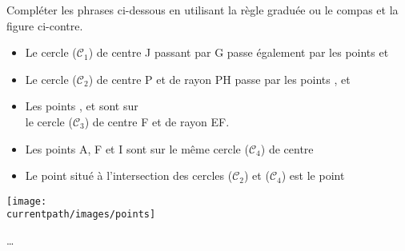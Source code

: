 \begin{exercice*}
  Compléter les phrases ci-dessous en utilisant la règle graduée ou le compas et la figure ci-contre.
  \begin{itemize}
     \item Le cercle ($\mathcal{C}_1$) de centre J passant par G passe également par les points \makebox[0.15\linewidth]{\dotfill} et  \makebox[0.15\linewidth]{\dotfill} \\ [-5mm]
     \item Le cercle ($\mathcal{C}_2$) de centre P et de rayon PH passe par les points  \makebox[0.15\linewidth]{\dotfill},  \makebox[0.15\linewidth]{\dotfill} et  \makebox[0.15\linewidth]{\dotfill}
     \item Les points  \makebox[0.15\linewidth]{\dotfill},  \makebox[0.15\linewidth]{\dotfill} et  \makebox[0.15\linewidth]{\dotfill} sont sur \\
        le cercle ($\mathcal{C}_3$) de centre F et de rayon EF.
     \item Les points A, F et I sont sur le même cercle ($\mathcal{C}_4$) de centre  \makebox[0.3\linewidth]{\dotfill}
     \item Le point situé à l'intersection des cercles ($\mathcal{C}_2$) et ($\mathcal{C}_4$) est le point  \makebox[0.3\linewidth]{\dotfill}
  \end{itemize}
  \begin{center}
     \texttt{[image: \\currentpath/images/points]}
  \end{center}
\end{exercice*} 
\begin{corrige}
  \dots
\end{corrige}
